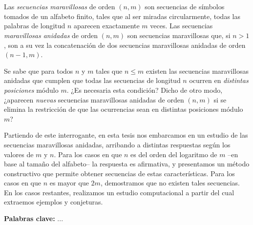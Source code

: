 \chapter*{\runtitulo}

Las \emph{secuencias maravillosas} de orden $(n,m)$ son secuencias de símbolos
tomados de un alfabeto finito, tales que al ser miradas circularmente, todas las
palabras de longitud $n$ aparecen exactamente $m$ veces.
Las secuencias \emph{maravillosas anidadas} de orden $(n,m)$ son secuencias
maravillosas que, si $n > 1$, son a su vez la concatenación de dos secuencias
maravillosas anidadas de orden $(n-1, m)$.

Se sabe que para todos $n$ y $m$ tales que $n \leq m$ existen las secuencias
maravillosas anidadas que cumplen que todas las secuencias de longitud $n$
ocurren en \emph{distintas posiciones} módulo $m$.
¿Es necesaria esta condición? Dicho de otro modo, ¿aparecen \emph{nuevas} secuencias
maravillosas anidadas de orden $(n,m)$ si se elimina la restricción de que las
ocurrencias sean en distintas posiciones módulo $m$?

Partiendo de este interrogante, en esta tesis nos embarcamos en un estudio de
las secuencias maravillosas anidadas, arribando a distintas respuestas según los
valores de $m$ y $n$. Para los casos en que $n$ es del orden del logaritmo de
$m$ --en base al tamaño del alfabeto-- la respuesta es afirmativa, y presentamos
un método constructivo que permite obtener secuencias de estas características.
Para los casos en que $n$ es mayor que $2m$, demostramos que no existen tales
secuencias. En los casos restantes, realizamos un estudio computacional a partir
del cual extraemos ejemplos y conjeturas.

\bigskip

\noindent\textbf{Palabras clave:} ...